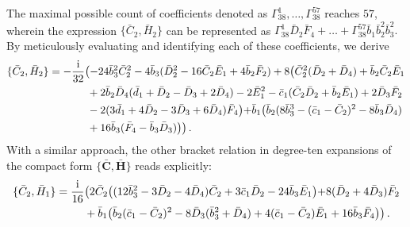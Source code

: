 \documentclass[10pt]{amsart}
\theoremstyle{definition}
\theoremstyle{corollary}
\theoremstyle{remark}
\theoremstyle{conclusion}
\begin{document}
The maximal possible count of coefficients denoted as $\Gamma_{38}^1,\ldots,\Gamma_{38}^{57}$ reaches $57$, wherein the expression $\{\bar{C}_2,\bar{H}_2\}$ can be represented as $\Gamma_{38}^1\bar{D}_2 \bar{F}_4 + \ldots + \Gamma_{38}^{57} \bar{b}_1 \bar{b}_2^2 \bar{b}_3^2.$ By meticulously evaluating and identifying each of these coefficients, we derive
\begin{align*}
    \{\bar{C}_2, \bar{H}_2\}&=-\frac{{\rm i}}{32}\bigl(-24 \bar{b}_3^2 \bar{C}_2^2-4 \bar{b}_3(\bar{D}_2^2-16 \bar{C}_2 \bar{E}_1+4 \bar{b}_2 \bar{F}_2) +8\bigl( \bar{C}_2^2(\bar{D}_2+\bar{D}_4)+\bar{b}_2\bar{C}_2 \bar{E}_1 \nonumber \\
&\hskip 1.25cm+2\bar{b}_2 \bar{D}_4(\bar{d}_1+\bar{D}_2-\bar{D}_3+2\bar{D}_4)-2 \bar{E}_1^2-\bar{c}_1(\bar{C}_2 \bar{D}_2+\bar{b}_2 \bar{E}_1)+2\bar{D}_3 \bar{F}_2 \nonumber\\
&\hskip 1.25cm -2(3\bar{d}_1+4 \bar{D}_2-3 \bar{D}_3+6 \bar{D}_4)\bar{F}_4\bigl)+\bar{b}_1\bigl(\bar{b}_2(8 \bar{b}_3^3-(\bar{c}_1-\bar{C}_2)^2-8 \bar{b}_3 \bar{D}_4) \nonumber\\
&\hskip 1.25cm + 16 \bar{b}_3(\bar{F}_4-\bar{b}_3 \bar{D}_3) \bigl)\bigl) \, .
\end{align*} 
With a similar approach, the other bracket relation in degree-ten expansions of the compact form $\{\bar{\textbf{C}},\bar{\textbf{H}}\}$ reads explicitly: 
\begin{align}
\{\bar{C}_2, \bar{H}_1\}&=\frac{{\rm i}}{16}\bigl(2 \bar{C}_2\bigl((12 \bar{b}_3^2-3\bar{D}_2-4 \bar{D}_4)\bar{C}_2+3 \bar{c}_1 \bar{D}_2-24 \bar{b}_3 \bar{E}_1\bigl)+8(\bar{D}_2+4 \bar{D}_3)\bar{F}_2 \nonumber\\
& \hskip 0.9cm +\bar{b}_1\bigl(\bar{b}_2(\bar{c}_1-\bar{C}_2)^2-8 \bar{D}_3(\bar{b}_3^2+\bar{D}_4)+4 (\bar{c}_1 - \bar{C}_2)\bar{E}_1+16 \bar{b}_3 \bar{F}_4\bigl) \bigl) \, .
\end{align}
\end{document}
